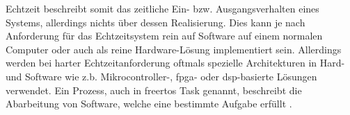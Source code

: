 \documentclass[../EDF Master Thesis.tex]{subfiles}
\begin{document}
    \clearpage

    Echtzeit beschreibt somit das zeitliche Ein- bzw. Ausgangsverhalten eines Systems, allerdings nichts über dessen Realisierung.
    Dies kann je nach Anforderung für das Echtzeitsystem rein auf Software auf einem normalen Computer oder auch als reine Hardware-Lösung implementiert sein.
    Allerdings werden bei harter Echtzeitanforderung oftmals spezielle Architekturen in Hard- und Software wie z.b. Mikrocontroller-, \ac{fpga}- oder \ac{dsp}-basierte Lösungen verwendet.
    Ein Prozess, auch in \ac{freertos} Task genannt, beschreibt die Abarbeitung von Software, welche eine bestimmte Aufgabe erfüllt \autocite{echtzeit_systeme}.

    \clearpage
\end{document}
